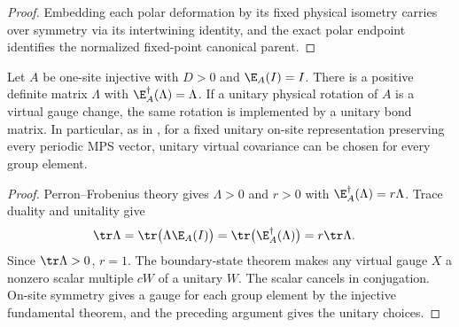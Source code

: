 \begin{proof}\leanok
    Embedding each polar deformation by its fixed physical isometry carries
    over symmetry via its intertwining identity, and the exact polar
    endpoint identifies the normalized fixed-point canonical parent.
\end{proof}

\begin{lemma}
    \label{thm:spt_unitary_virtual_covariance_unital}
    \leanok
    Let $A$ be one-site injective with $D>0$ and $\E_A(I)=I$.
    There is a positive definite matrix $\Lambda$ with
    $\E_A^\dagger(\Lambda)=\Lambda$. If a unitary physical rotation of $A$
    is a virtual gauge change, the same rotation is implemented by a
    unitary bond matrix. In particular, as in
    \cite[Section~II.C, isometric form and symmetries]{Schuch2011Phases},
    for a fixed unitary on-site representation preserving every periodic MPS
    vector, unitary virtual covariance can be chosen for every group element.
\end{lemma}

\begin{proof}\leanok
    Perron--Frobenius theory gives $\Lambda>0$ and $r>0$ with
    $\E_A^\dagger(\Lambda)=r\Lambda$. Trace duality and unitality give
    \begin{align}
        \tr\Lambda & =\tr\bigl(\Lambda\E_A(I)\bigr)
        =\tr\bigl(\E_A^\dagger(\Lambda)\bigr)=r\tr\Lambda.
        \notag
    \end{align}
    Since $\tr\Lambda>0$, $r=1$. The boundary-state theorem makes any
    virtual gauge $X$ a nonzero scalar multiple $cW$ of a unitary $W$.
    The scalar cancels in conjugation. On-site symmetry gives a gauge
    for each group element by the injective fundamental theorem, and the
    preceding argument gives the unitary choices.
\end{proof}

